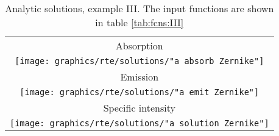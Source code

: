 \begin{table}[htbp]
\caption[Analytic solutions, example III]{Analytic solutions, example III. The input functions are shown in table \eqref{tab:fcns:III}}
\begin{center}
\begin{tabular}{c}
%
Absorption \\
\texttt{[image: graphics/rte/solutions/"a absorb Zernike"]} \\[10pt]
%
Emission \\
\texttt{[image: graphics/rte/solutions/"a emit Zernike"]} \\[10pt]
%
Specific intensity \\
\texttt{[image: graphics/rte/solutions/"a solution Zernike"]} \\
%
%
\end{tabular}
\end{center}
\label{rte:solutions III}
\end{table}%


\endinput %
